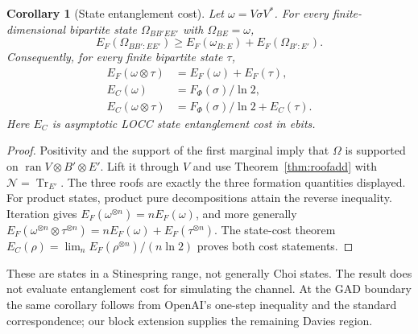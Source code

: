 \documentclass[11pt]{article}
\newtheorem{corollary}[theorem]{Corollary}
\begin{document}
\begin{corollary}[State entanglement cost]\label{cor:cost}
Let $\omega=V\sigma V^*$. For every finite-dimensional bipartite state
$\Omega_{BB'EE'}$ with $\Omega_{BE}=\omega$,
\[
 E_F(\Omega_{BB':EE'})\ge E_F(\omega_{B:E})+
                              E_F(\Omega_{B':E'}).
\]
Consequently, for every finite bipartite state $\tau$,
\begin{align*}
 E_F(\omega\otimes\tau)&=E_F(\omega)+E_F(\tau),\\
 E_C(\omega)&=F_\Phi(\sigma)/\ln2,\\
 E_C(\omega\otimes\tau)&=F_\Phi(\sigma)/\ln2+E_C(\tau).
\end{align*}
Here $E_C$ is asymptotic LOCC \emph{state} entanglement cost in ebits.
\end{corollary}
\begin{proof}
Positivity and the support of the first marginal imply that $\Omega$ is
supported on $\operatorname{ran}V\otimes B'\otimes E'$. Lift it through $V$
and use Theorem~\ref{thm:roofadd} with $\mathcal N=\operatorname{Tr}_{E'}$.
The three roofs are exactly the three formation quantities displayed.
For product states, product pure decompositions attain the reverse inequality.
Iteration gives $E_F(\omega^{\otimes n})=nE_F(\omega)$, and more generally
$E_F(\omega^{\otimes n}\otimes\tau^{\otimes n})=
nE_F(\omega)+E_F(\tau^{\otimes n})$.
The state-cost theorem $E_C(\rho)=\lim_nE_F(\rho^{\otimes n})/(n\ln2)$
\cite{hht} proves both cost statements.
\end{proof}
These are states in a Stinespring range, not generally Choi states. The result
does not evaluate entanglement cost for simulating the channel. At the GAD
boundary the same corollary follows from OpenAI's one-step inequality and
the standard correspondence; our block extension supplies the remaining
Davies region.
\end{document}
